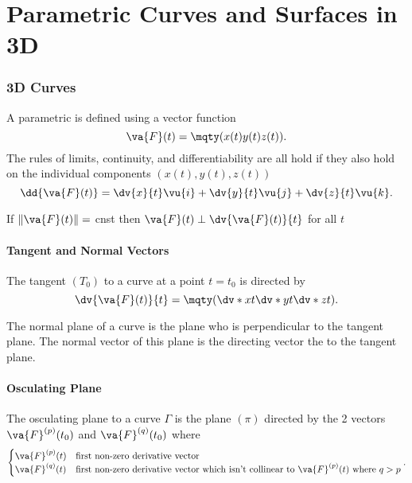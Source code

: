 \part{Parametric Curves and Surfaces in 3D}
\section{3D Curves}

A parametric is defined using a vector function
\[
	\va{F}(t) = \mqty(x(t)\\y(t)\\z(t))
	.\]
The rules of limits, continuity, and differentiability are all hold if they also hold on the individual components $(x(t),y(t),z(t))$\\

\[
	\dd{\va{F}(t)} = \dv{x}{t}\vu{i} + \dv{y}{t}\vu{j} + \dv{z}{t} \vu{k}
	.\]

\begin{remark}
	If $\left\| \va{F}(t) \right\| = $ cnst then $\va{F}(t) \perp \dv{\va{F}(t)}{t}$ for all $t$
\end{remark}

\subsection{Tangent and Normal Vectors}
The tangent $(T_0)$ to a curve at a point $t=t_0$ is directed by
\[
	\dv{\va{F}(t)}{t} =  \mqty(\dv*{x}{t}\\\dv*{y}{t}\\\dv*{z}{t})
	.\]

The normal plane of a curve is the plane who is perpendicular to the tangent plane. The normal vector of this plane is the directing vector the to the tangent plane.

\subsection{Osculating Plane}
The osculating plane to a curve $\Gamma$ is the plane $(\pi)$ directed by the 2 vectors $\va{F}^{(p)}(t_0)$ and $\va{F}^{(q)}(t_0)$ where
\[
	\begin{cases}
		\va{F}^{(p)}(t) & \text{first non-zero derivative vector}                                                              \\
		\va{F}^{(q)}(t) & \text{first non-zero derivative vector which isn't collinear to } \va{F}^{(p)}(t) \text{ where } q>p
	\end{cases}
	.\]


